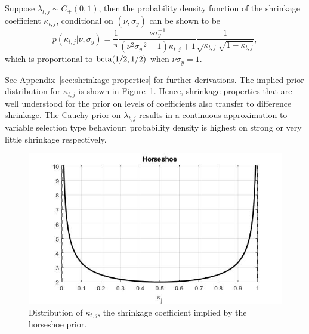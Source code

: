 %
\begin{definition}\label{eq:def-1}
    Suppose $\lambda_{t,j}\sim C_+(0,1)$, then the probability density function of the shrinkage coefficient $\kappa_{t,j}$, conditional on $(\nu,\sigma_y)$ can be shown to be
    \begin{equation}
        p(\kappa_{t,j}\vert \nu,\sigma_y) = \frac{1}{\pi}\frac{\nu\sigma^{-1}_y}{(\nu^2\sigma^{-2}_y-1)\kappa_{t,j}+1}\frac{1}{\sqrt{\kappa_{t,j}}\sqrt{1-\kappa_{t,j}}},
    \end{equation}
    which is proportional to $\mathrm{beta}(1/2,1/2)$ when $\nu \sigma_y=1$.
\end{definition}
%
See Appendix~\ref{sec:shrinkage-properties} for further derivations. The implied prior distribution for $\kappa_{t,j}$ is shown in Figure~\ref{fig:ShrinkageCoefficients}. Hence, shrinkage properties that are well understood for the prior on levels of coefficients also transfer to difference shrinkage. The Cauchy prior on $\lambda_{t,j}$ results in a continuous approximation to variable selection type behaviour: probability density is highest on strong or very little shrinkage respectively.
\begin{figure}
    \centering
    \includegraphics[width=\textwidth]{Figures/HS_kappa.jpg}
    \caption{Distribution of $\kappa_{t,j}$, the shrinkage coefficient implied by the horseshoe prior.}
    \label{fig:ShrinkageCoefficients}
\end{figure}
%

